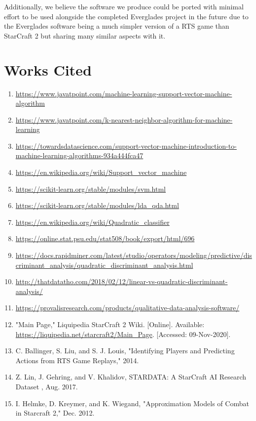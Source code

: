 \documentclass[a4paper,12pt]{report}
\begin{document}
Additionally, we believe the software we produce could be ported with minimal effort to be used alongside the completed Everglades project in the future due to the Everglades software being a much simpler version of a RTS game than StarCraft 2 but sharing many similar aspects with it.

\chapter{Works Cited}

\begin{enumerate}
\item \url{https://www.javatpoint.com/machine-learning-support-vector-machine-algorithm}
\item \url{https://www.javatpoint.com/k-nearest-neighbor-algorithm-for-machine-learning}
\item \url{https://towardsdatascience.com/support-vector-machine-introduction-to-machine-learning-algorithms-934a444fca47}
\item \url{https://en.wikipedia.org/wiki/Support_vector_machine}
\item \url{https://scikit-learn.org/stable/modules/svm.html}
\item \url{https://scikit-learn.org/stable/modules/lda_qda.html}
\item \url{https://en.wikipedia.org/wiki/Quadratic_classifier}
\item \url{https://online.stat.psu.edu/stat508/book/export/html/696}
\item \url{https://docs.rapidminer.com/latest/studio/operators/modeling/predictive/discriminant_analysis/quadratic_discriminant_analysis.html}
\item \url{http://thatdatatho.com/2018/02/12/linear-vs-quadratic-discriminant-analysis/}
\item \url{https://provalisresearch.com/products/qualitative-data-analysis-software/}
\item "Main Page," Liquipedia StarCraft 2 Wiki. [Online]. Available: \url{https://liquipedia.net/starcraft2/Main_Page}. [Accessed: 09-Nov-2020].
\item C. Ballinger, S. Liu, and S. J. Louis, "Identifying Players and Predicting Actions from RTS Game Replays," 2014.
\item Z. Lin, J. Gehring, and V. Khalidov, STARDATA: A StarCraft AI Research Dataset , Aug. 2017.
\item I. Helmke, D. Kreymer, and K. Wiegand, "Approximation Models of Combat in Starcraft 2," Dec. 2012.

\end{enumerate}
\end{document}
